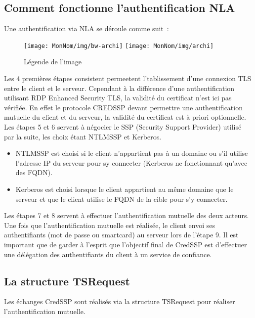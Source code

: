 \subsection{Comment fonctionne l'authentification NLA}
Une authentification via NLA se déroule comme suit :


\begin{figure}[ht]
  \centering
  \ifssticbw
    \texttt{[image: MonNom/img/bw-archi]}
  \else
    \texttt{[image: MonNom/img/archi]}
  \fi
  \caption{Légende de l'image}
  \label{fig:monnom:archi}
\end{figure}

Les 4 premières étapes consistent permeetent l'tablissement d'une connexion TLS entre le client et le serveur. Cependant à la différence d’une authentification utilisant RDP Enhanced Security TLS, la validité du certificat n’est ici pas vérifiée. En effet le protocole CREDSSP devant permettre une authentification mutuelle du client et du serveur, la validité du certificat est à priori optionnelle.
Les étapes 5 et 6 servent à négocier le SSP (Security Support Provider) utilisé par la suite, les choix étant NTLMSSP et Kerberos.
\begin{itemize}
	\item NTLMSSP est choisi si le client n’appartient pas à un domaine ou s'il utilise l’adresse IP du serveur pour sy connecter (Kerberos ne fonctionnant qu'avec des FQDN).
	\item Kerberos est choisi lorsque le client appartient au même domaine que le serveur et que le client utilise le FQDN de la cible pour s'y connecter.
\end{itemize}
Les étapes 7 et 8 servent à effectuer l’authentification mutuelle des deux acteurs.
Une fois que l'authentification mutuelle est réalisée, le client envoi ses authentifiants (mot de passe ou smartcard) au serveur lors de l'étape 9. Il est important que de garder à l'esprit que l'objectif final de CredSSP est d'effectuer une délégation des authentifiants du client à un service de confiance. 

\subsection{La structure TSRequest}
Les échanges CredSSP sont réalisés via la structure TSRequest pour réaliser l'authentification mutuelle.

